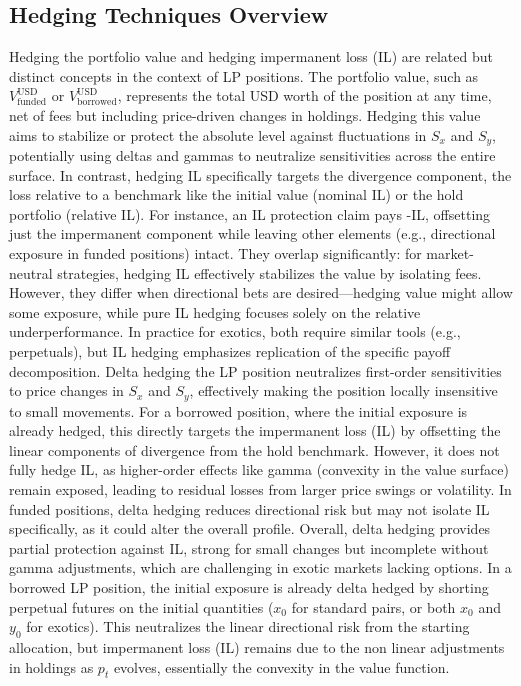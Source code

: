 \documentclass{article}
\begin{document}
\subsection{Hedging Techniques Overview}
Hedging the portfolio value and hedging impermanent loss (IL) are related but distinct concepts in the context of LP positions. The portfolio value, such as $V_{\text{funded}}^{\text{USD}}$ or $V_{\text{borrowed}}^{\text{USD}}$, represents the total USD worth of the position at any time, net of fees but including price-driven changes in holdings. Hedging this value aims to stabilize or protect the absolute level against fluctuations in $S_x$ and $S_y$, potentially using deltas and gammas to neutralize sensitivities across the entire surface.
In contrast, hedging IL specifically targets the divergence component, the loss relative to a benchmark like the initial value (nominal IL) or the hold portfolio (relative IL). For instance, an IL protection claim pays -IL, offsetting just the impermanent component while leaving other elements (e.g., directional exposure in funded positions) intact. 
They overlap significantly: for market-neutral strategies, hedging IL effectively stabilizes the value by isolating fees. However, they differ when directional bets are desired—hedging value might allow some exposure, while pure IL hedging focuses solely on the relative underperformance. In practice for exotics, both require similar tools (e.g., perpetuals), but IL hedging emphasizes replication of the specific payoff decomposition.
Delta hedging the LP position neutralizes first-order sensitivities to price changes in $S_x$ and $S_y$, effectively making the position locally insensitive to small movements. For a borrowed position, where the initial exposure is already hedged, this directly targets the impermanent loss (IL) by offsetting the linear components of divergence from the hold benchmark. However, it does not fully hedge IL, as higher-order effects like gamma (convexity in the value surface) remain exposed, leading to residual losses from larger price swings or volatility.
In funded positions, delta hedging reduces directional risk but may not isolate IL specifically, as it could alter the overall profile. Overall, delta hedging provides partial protection against IL, strong for small changes but incomplete without gamma adjustments, which are challenging in exotic markets lacking options.
In a borrowed LP position, the initial exposure is already delta hedged by shorting perpetual futures on the initial quantities ($x_0$ for standard pairs, or both $x_0$ and $y_0$ for exotics). This neutralizes the linear directional risk from the starting allocation, but impermanent loss (IL) remains due to the non linear adjustments in holdings as $p_t$ evolves, essentially the convexity in the value function.
\end{document}
